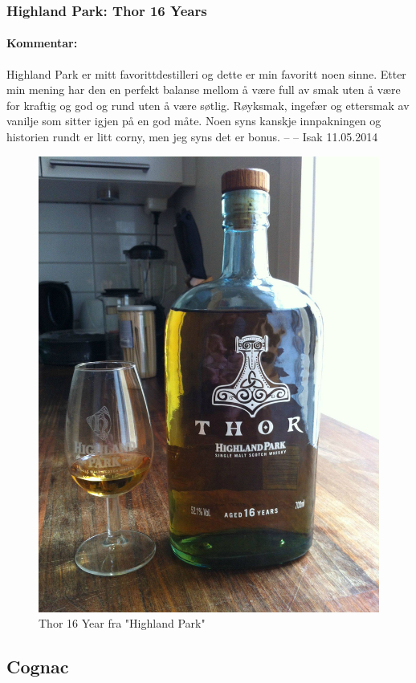 \documentclass[12pt,a4paper,oneside,norsk]{article}
\begin{document}
\newpage
\subsubsection{Highland Park: Thor 16 Years}
\paragraph{Kommentar:} Highland Park er mitt favorittdestilleri og dette er min favoritt noen sinne. Etter min mening har den en perfekt balanse mellom å være full av smak uten å være for kraftig og god og rund uten å være søtlig. Røyksmak, ingefær og ettersmak av vanilje som sitter igjen på en god måte. Noen syns kanskje innpakningen og historien rundt er litt corny, men jeg syns det er bonus. 
\newline
-- -- Isak 11.05.2014

\begin{figure} [H]
\centering
\includegraphics[scale=0.1]{Bilder/Sprit/HighlandParkThor.jpg}
\caption{Thor 16 Year fra "Highland Park"}
\end{figure}     


\newpage
\subsection{Cognac}
\end{document}

